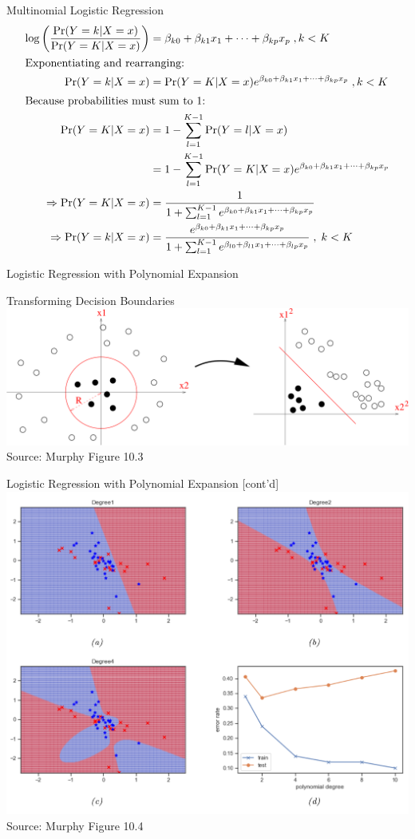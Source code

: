 \documentclass[ignorenonframetext,xcolor=x11names]{beamer}
\begin{document}
\begin{frame}{Multinomial Logistic Regression}
\small
\begin{align*}
\log \left( \frac{\Pr(Y=k | X=x)}{\Pr(Y=K | X=x)}\right) &= \beta_{k0}+\beta_{k1}x_1 + \cdots + \beta_{kp}x_p \; , k<K \\
\intertext{Exponentiating and rearranging:}
\Pr(Y=k | X=x) &= \Pr(Y=K | X=x) e^{\beta_{k0}+\beta_{k1}x_1 + \cdots + \beta_{kp}x_p} \;, k<K\\
\intertext{Because probabilities must sum to 1:}
\Pr(Y=K | X=x) &= 1 - \sum_{l=1}^{K-1} \Pr(Y=l | X=x) \\
&= 1 - \sum_{l=1}^{K-1} \Pr(Y=K | X=x) e^{\beta_{k0}+\beta_{k1}x_1 + \cdots + \beta_{kp}x_p} \\
\Rightarrow \Pr(Y=K | X = x) &= \frac{1}{1 + \sum_{l=1}^{K-1} e^{\beta_{k0}+\beta_{k1}x_1 + \cdots + \beta_{kp}x_p}} \\
\Rightarrow \Pr(Y=k|X=x) &= \frac{e^{\beta_{k0}+\beta_{k1}x_1 + \cdots + \beta_{kp}x_p}}{1 + \sum_{l=1}^{K-1} e^{\beta_{l0}+\beta_{l1}x_1 + \cdots + \beta_{lp}x_p}} \;, \; k < K
\end{align*}
\end{frame}

\begin{frame}{Logistic Regression with Polynomial Expansion}
\begin{block}{Transforming Decision Boundaries}
\includegraphics[width=\textwidth]{Figure_10.3.png} \\
\scriptsize Source: Murphy Figure 10.3
\end{block}
\end{frame}

\begin{frame}{Logistic Regression with Polynomial Expansion \small [cont'd]}
\centering
\includegraphics[width=.8\textwidth]{screen3.png} \\
\scriptsize Source: Murphy Figure 10.4
\end{frame}
\end{document}
